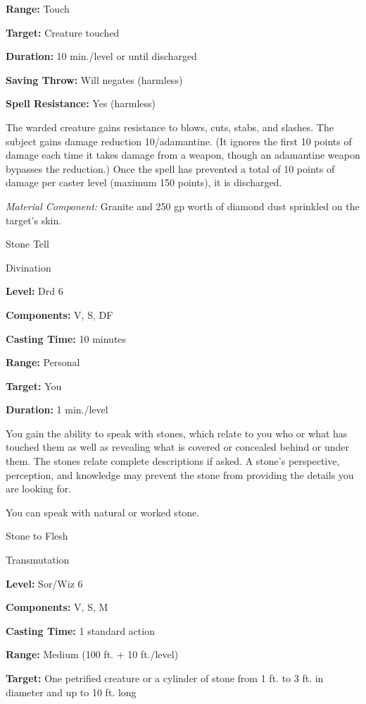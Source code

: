 \documentclass{article}
\begin{document}
\textbf{Range:} Touch

\textbf{Target:} Creature touched

\textbf{Duration:} 10 min./level or until discharged

\textbf{Saving Throw: }Will negates (harmless)

\textbf{Spell Resistance:} Yes (harmless)

The warded creature gains resistance to blows, cuts, stabs, and slashes. The subject 
gains damage reduction 10/adamantine. (It ignores the first 10 points of damage 
each time it takes damage from a weapon, though an adamantine weapon bypasses the 
reduction.) Once the spell has prevented a total of 10 points of damage per caster 
level (maximum 150 points), it is discharged.

\textit{Material Component: }Granite and 250 gp worth of diamond dust sprinkled 
on the target's skin.

\vspace{12pt}
Stone Tell

Divination

\textbf{Level:} Drd 6

\textbf{Components:} V, S, DF

\textbf{Casting Time:} 10 minutes

\textbf{Range:} Personal

\textbf{Target:} You

\textbf{Duration:} 1 min./level

You gain the ability to speak with stones, which relate to you who or what has 
touched them as well as revealing what is covered or concealed behind or under 
them. The stones relate complete descriptions if asked. A stone's perspective, 
perception, and knowledge may prevent the stone from providing the details you 
are looking for.

You can speak with natural or worked stone.

\vspace{12pt}
Stone to Flesh

Transmutation

\textbf{Level:} Sor/Wiz 6

\textbf{Components:} V, S, M

\textbf{Casting Time:} 1 standard action

\textbf{Range: }Medium (100 ft. + 10 ft./level)

\textbf{Target:} One petrified creature or a cylinder of stone from 1 ft. to 3 
ft. in diameter and up to 10 ft. long
\end{document}
